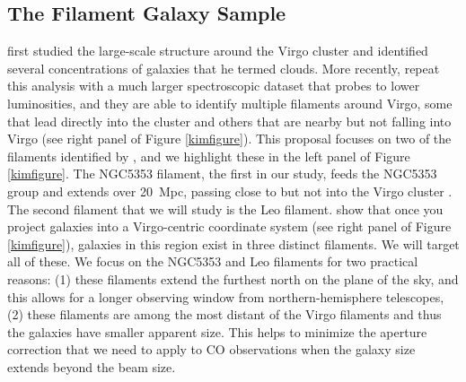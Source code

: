 \documentclass[11pt, preprint]{aastex}
\newcommand{\ha}{$H\alpha$}
\begin{document}
 

\vspace*{-1cm}\subsection{The Filament Galaxy Sample} 
\vspace*{-.4cm}
\citet{tully82} first studied the large-scale structure around the Virgo
cluster and identified several concentrations of galaxies that he
termed clouds.  More recently, \citet{kim16} repeat this analysis with
a much larger spectroscopic dataset that probes to lower luminosities,
and they are able to identify multiple
filaments around Virgo, some that lead directly into the cluster and
others that are nearby but not falling into Virgo (see right panel of Figure \ref{kimfigure}).
This proposal focuses on two of the filaments identified by
\citet{kim16}, and we highlight these in the left panel of Figure
\ref{kimfigure}.  The NGC5353 filament, the first in our study, feeds the NGC5353 group and extends over 20~Mpc,
passing close to but not into the Virgo cluster \citep{kim16}.  The second filament
that we will study is the Leo filament.  \citet{kim16} show that once
you project galaxies into a Virgo-centric coordinate system (see right
panel of Figure \ref{kimfigure}), galaxies
in this region exist in three distinct filaments.  We will target all
of these.  We focus on
the NGC5353 and Leo filaments for two practical reasons:  (1) these filaments
extend the furthest north on the plane of the sky, and this allows
for a longer observing window from northern-hemisphere telescopes, (2)
these filaments are among the most distant of the Virgo filaments and
thus the galaxies have smaller apparent size.  This helps to minimize
the aperture correction that we need to apply to CO observations when the galaxy size extends beyond the beam size.  
\end{document}
